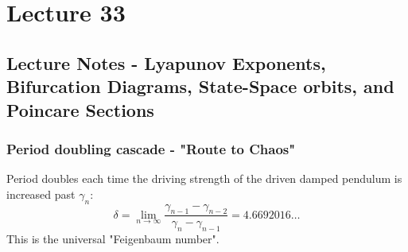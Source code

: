 \documentclass[../PHYS306Notes.tex]{subfiles}
\begin{document}
\section{Lecture 33}
\subsection{Lecture Notes - Lyapunov Exponents, Bifurcation Diagrams, State-Space orbits, and Poincare Sections}
\subsubsection{Period doubling cascade - "Route to Chaos"}
Period doubles each time the driving strength of the driven damped pendulum is increased past $\gamma_n$:
\[\delta = \lim_{n\rightarrow\infty}\frac{\gamma_{n-1} - \gamma_{n-2}}{\gamma_n - \gamma_{n-1}} = 4.6692016\ldots\]
This is the universal "Feigenbaum number".
\end{document}
